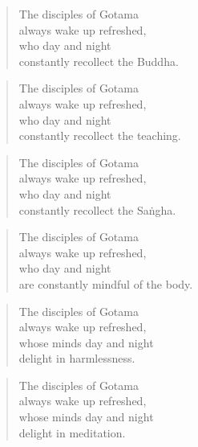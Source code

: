 \documentclass[12pt,openany]{book}%
\begin{document}
\begin{verse}%
The disciples of Gotama \\
always wake up refreshed, \\
who day and night \\
constantly recollect the Buddha. 

%
\end{verse}

\begin{verse}%
The disciples of Gotama \\
always wake up refreshed, \\
who day and night \\
constantly recollect the teaching. 

%
\end{verse}

\begin{verse}%
The disciples of Gotama \\
always wake up refreshed, \\
who day and night \\
constantly recollect the \textsanskrit{Saṅgha}. 

%
\end{verse}

\begin{verse}%
The disciples of Gotama \\
always wake up refreshed, \\
who day and night \\
are constantly mindful of the body. 

%
\end{verse}

\begin{verse}%
The disciples of Gotama \\
always wake up refreshed, \\
whose minds day and night \\
delight in harmlessness. 

%
\end{verse}

\begin{verse}%
The disciples of Gotama \\
always wake up refreshed, \\
whose minds day and night \\
delight in meditation. 

%
\end{verse}
\end{document}

